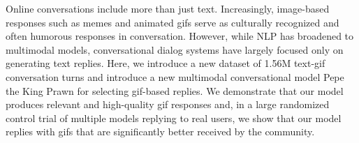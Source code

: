 Online conversations include more than just text. Increasingly, image-based responses such as memes and animated gifs serve as culturally recognized and often humorous responses in conversation. However, while NLP has broadened to multimodal models, conversational dialog systems have largely focused only on generating text replies. Here, we introduce a new dataset of 1.56M text-gif conversation turns and introduce a new multimodal conversational model Pepe the King Prawn for selecting gif-based replies. We demonstrate that our model produces relevant and high-quality gif responses and, in a large randomized control trial of multiple models replying to real users, we show that our model replies with gifs that are significantly better received by the community.
